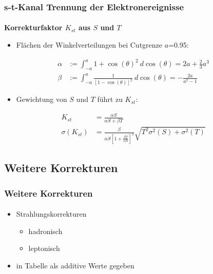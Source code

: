 \documentclass{beamer}
\begin{document}
\begin{frame}
	\frametitle{s-t-Kanal Trennung der Elektronereignisse}
	\framesubtitle{}
	\textbf{Korrekturfaktor $K_{st}$ aus $S$ und $T$}\\
	\begin{itemize}
		\item Flächen der Winkelverteilungen bei Cutgrenze $a$=0.95:
	\end{itemize}
		\begin{align*}
			\alpha &:= \int_{-a}^{a} 1+\cos(\theta)^2\ d\cos(\theta) = 2a + \frac{2}{3}a^3\\
			\beta  &:= \int_{-a}^{a}\frac{1}{[1-\cos(\theta)]^2}\ d\cos(\theta) = -\frac{2a}{a^2-1}
		\end{align*}
	\begin{itemize}
		\item Gewichtung von $S$ und $T$ führt zu $K_{st}$:
	\end{itemize}
		\begin{align*}
			K_{st} &= \frac{\alpha S}{\alpha S	+ \beta T}\\
			\sigma(K_{st}) &= \frac{\beta}{\alpha S [1+\frac{\beta T}{\alpha S}]^2} \sqrt{T^2 \sigma^2(S) + \sigma^2(T)}
		\end{align*}
\end{frame}


\subsection{Weitere Korrekturen}

\begin{frame}
	\frametitle{Weitere Korrekturen}
	\framesubtitle{}
	\begin{itemize}
		\item Strahlungskorrekturen
		\begin{itemize}
			\item hadronisch
			\item leptonisch
		\end{itemize}
		\item in Tabelle als additive Werte gegeben
	\end{itemize}
\end{frame}

\end{document}
